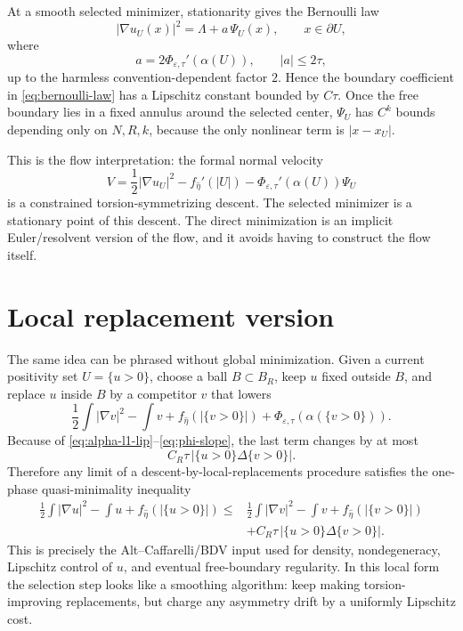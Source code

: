\documentclass[11pt]{article}
\newcommand{\abs}[1]{\left|#1\right|}
\begin{document}
At a smooth selected minimizer, stationarity gives the Bernoulli law
\[
   \abs{\nabla u_U(x)}^2
      =
      \Lambda
      +
      a\,\Psi_U(x),
   \qquad x\in\partial U,
   \tag{3.5}\label{eq:bernoulli-law}
\]
where
\[
   a=2\Phi_{\varepsilon,\tau}'(\alpha(U)),
   \qquad
   \abs a\le 2\tau,
   \tag{3.6}
\]
up to the harmless convention-dependent factor \(2\).  Hence the boundary
coefficient in \eqref{eq:bernoulli-law} has a Lipschitz constant bounded by
\(C\tau\).
Once the free boundary lies in a fixed annulus around the selected center,
\(\Psi_U\) has \(C^k\) bounds depending only on \(N,R,k\), because the only
nonlinear term is \(\abs{x-x_U}\).

This is the flow interpretation: the formal normal velocity
\[
   V
      =
      \frac12\abs{\nabla u_U}^2
      -f_{\hat\eta}'(\abs U)
      -\Phi_{\varepsilon,\tau}'(\alpha(U))\Psi_U
   \tag{3.7}
\]
is a constrained torsion-symmetrizing descent.  The selected minimizer is a
stationary point of this descent.  The direct minimization is an implicit
Euler/resolvent version of the flow, and it avoids having to construct the
flow itself.

\section{Local replacement version}

The same idea can be phrased without global minimization.  Given a current
positivity set \(U=\{u>0\}\), choose a ball \(B\subset B_R\), keep \(u\) fixed
outside \(B\), and replace \(u\) inside \(B\) by a competitor \(v\) that lowers
\[
   \frac12\int\abs{\nabla v}^2-\int v
      + f_{\hat\eta}(\abs{\{v>0\}})
      + \Phi_{\varepsilon,\tau}(\alpha(\{v>0\})).
\]
Because of \eqref{eq:alpha-l1-lip}--\eqref{eq:phi-slope}, the last term
changes by at most
\[
   C_R\tau\,
   \abs{\{u>0\}\Delta\{v>0\}}.
   \tag{4.1}
\]
Therefore any limit of a descent-by-local-replacements procedure satisfies the
one-phase quasi-minimality inequality
\[
\begin{aligned}
   \frac12\int\abs{\nabla u}^2-\int u
      + f_{\hat\eta}(\abs{\{u>0\}})
   \le{}&
   \frac12\int\abs{\nabla v}^2-\int v
      + f_{\hat\eta}(\abs{\{v>0\}}) \\
   &+ C_R\tau\,
      \abs{\{u>0\}\Delta\{v>0\}}.
\end{aligned}
\tag{4.2}
\]
This is precisely the Alt--Caffarelli/BDV input used for density,
nondegeneracy, Lipschitz control of \(u\), and eventual free-boundary
regularity.  In this local form the selection step looks like a smoothing
algorithm: keep making torsion-improving replacements, but charge any
asymmetry drift by a uniformly Lipschitz cost.
\end{document}
